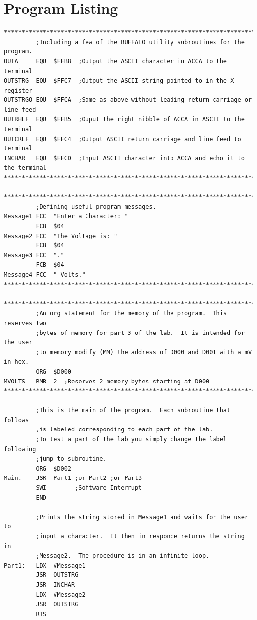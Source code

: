 \documentclass[12pt]{report}
\begin{document}
\section*{Program Listing}
	\begin{Verbatim}[frame=single, fontsize=\small]
********************************************************************************         
         ;Including a few of the BUFFALO utility subroutines for the program.
OUTA     EQU  $FFB8  ;Output the ASCII character in ACCA to the terminal
OUTSTRG  EQU  $FFC7  ;Output the ASCII string pointed to in the X register
OUTSTRGO EQU  $FFCA  ;Same as above without leading return carriage or line feed
OUTRHLF  EQU  $FFB5  ;Ouput the right nibble of ACCA in ASCII to the terminal
OUTCRLF  EQU  $FFC4  ;Output ASCII return carriage and line feed to terminal
INCHAR   EQU  $FFCD  ;Input ASCII character into ACCA and echo it to the terminal
******************************************************************************** 

******************************************************************************** 
         ;Defining useful program messages.
Message1 FCC  "Enter a Character: "
         FCB  $04
Message2 FCC  "The Voltage is: "
         FCB  $04
Message3 FCC  "."
         FCB  $04
Message4 FCC  " Volts."
******************************************************************************** 

******************************************************************************** 
         ;An org statement for the memory of the program.  This reserves two 
         ;bytes of memory for part 3 of the lab.  It is intended for the user
         ;to memory modify (MM) the address of D000 and D001 with a mV in hex.
         ORG  $D000
MVOLTS   RMB  2  ;Reserves 2 memory bytes starting at D000
******************************************************************************** 
         
         ;This is the main of the program.  Each subroutine that follows
         ;is labeled corresponding to each part of the lab.
         ;To test a part of the lab you simply change the label following
         ;jump to subroutine.
         ORG  $D002
Main:    JSR  Part1 ;or Part2 ;or Part3
         SWI        ;Software Interrupt
         END

         ;Prints the string stored in Message1 and waits for the user to
         ;input a character.  It then in responce returns the string in
         ;Message2.  The procedure is in an infinite loop.
Part1:   LDX  #Message1
         JSR  OUTSTRG
         JSR  INCHAR
         LDX  #Message2
         JSR  OUTSTRG
         RTS


\end{Verbatim}
\end{document}
